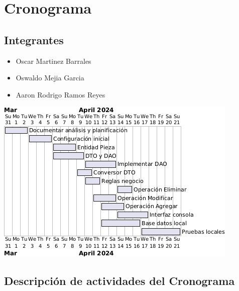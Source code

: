 \section*{\centering Cronograma}

\subsection*{Integrantes}
    \begin{itemize}
        \item Oscar Martinez Barrales
        \item Oswaldo Mejia Garcia
        \item Aaron Rodrigo Ramos Reyes
        \newline
    \end{itemize}


\includegraphics[width=.9\textwidth]{imag/DiagramaCronograma.png}


\subsection*{Descripción de actividades del Cronograma}


